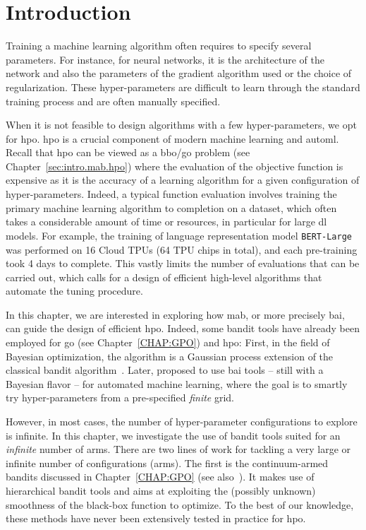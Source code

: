 \section{Introduction}\label{sec:dttts.intro}

Training a machine learning algorithm often requires to specify several parameters. For instance, for neural networks, it is the architecture of the network and also the parameters of the gradient algorithm used or the choice of regularization. These \gls{hyper-parameters} are difficult to learn through the standard training process and are often manually specified.

When it is not feasible to design algorithms with a few hyper-parameters, we opt for \gls{hpo}. \gls{hpo} is a crucial component of modern machine learning and \gls{automl}. Recall that \gls{hpo} can be viewed as a \gls{bbo}/\gls{go} problem (see Chapter~\ref{sec:intro.mab.hpo}) where the evaluation of the objective function is expensive as it is the accuracy of a learning algorithm for a given configuration of hyper-parameters. Indeed, a typical function evaluation involves training the primary machine learning algorithm to completion on a dataset, which often takes a considerable amount of time or resources, in particular for large \gls{dl} models. For example, the training of language representation model \texttt{BERT-Large}~\citep{devlin2019bert} was performed on 16 Cloud TPUs (64 TPU chips in total), and each pre-training took 4 days to complete. This vastly limits the number of evaluations that can be carried out, which calls for a design of efficient high-level algorithms that automate the tuning procedure.

In this chapter, we are interested in exploring how \gls{mab}, or more precisely \gls{bai}, can guide the design of efficient \gls{hpo}. Indeed, some bandit tools have already been employed for \gls{go} (see Chapter~\ref{CHAP:GPO}) and \gls{hpo}: First, in the field of Bayesian optimization, the \GPUCB algorithm \citep{srinivas2010gpucb} is a Gaussian process extension of the classical \UCB bandit algorithm~\citep{auer2002ucb}. Later, \citet{hoffman2014bayesgap} proposed to use \gls{bai} tools -- still with a Bayesian flavor -- for automated machine learning, where the goal is to smartly try hyper-parameters from a pre-specified \emph{finite} grid. 

However, in most cases, the number of hyper-parameter configurations to explore is infinite. In this chapter, we investigate the use of bandit tools suited for an \emph{infinite} number of arms. There are two lines of work for tackling a very large or infinite number of configurations (arms). The first is the continuum-armed bandits discussed in Chapter~\ref{CHAP:GPO} (see also~\citealt{bubeck2010x,grill2015poo,shang2019adaptive,bartlett2019simple}). It makes use of hierarchical bandit tools and aims at exploiting the (possibly unknown) smoothness of the black-box function to optimize. To the best of our knowledge, these methods have never been extensively tested in practice for \gls{hpo}.

